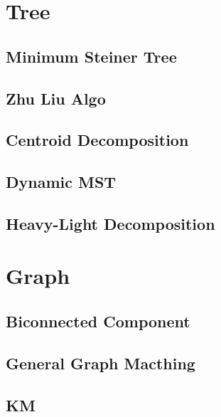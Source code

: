 \documentclass[a4paper,10pt,twocolumn,oneside]{article}
\begin{document}
\section{Tree}

\subsection{Minimum Steiner Tree}


\subsection{Zhu Liu Algo}


\subsection{Centroid Decomposition}


\subsection{Dynamic MST}


\subsection{Heavy-Light Decomposition}


\section{Graph}
\subsection{Biconnected Component}


\subsection{General Graph Macthing}


\subsection{KM}

\end{document}
